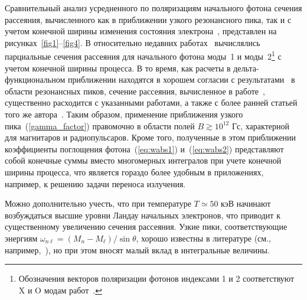 \documentclass[cp1251%
               ]{jetp} %
\begin{document}
Сравнительный анализ усредненного по поляризациям начального фотона сечения 
рассеяния, вычисленного как в приближении узкого резонансного пика, так и с 
учетом конечной ширины изменения состояния электрона~\cite{Harding:1991,SchwarmD:2017}, представлен на 
рисунках~\ref{fig1}--\ref{fig4}.  
В относительно недавних работах~\cite{Mushtukov:2016,SchwarmD:2017} вычислялись 
парциальные сечения рассеяния для начального фотона моды~1 и моды~2\footnote{Обозначения векторов поляризации фотонов индексами 1 и 2 соответствуют X и O модам работ~\cite{Mushtukov:2016,SchwarmD:2017}.} с учетом 
конечной ширины процесса. В то время, как расчеты в дельта-функциональном 
приближении находятся в хорошем согласии с 
результатами~\cite{Harding:1991,SchwarmD:2017} в области резонансных пиков, 
сечение рассеяния, вычисленное в работе~\cite{Mushtukov:2016}, существенно 
расходится с указанными работами, а также с более ранней статьей того же 
автора~\cite{Mushtukov:2015}. Таким образом, применение 
приближения узкого пика~(\ref{gamma_factor}) правомочно  в области полей $B \gtrsim 10^{12}$ Гс, характерной для магнитаров и радиопульсаров. Кроме того, 
полученные в этом приближении коэффициенты поглощения фотона~(\ref{eq:wabs1}) 
и~(\ref{eq:wabs2}) 
представляют собой конечные суммы вместо многомерных интегралов при учете 
конечной ширины процесса, что является гораздо более 
удобным в приложениях, например, к решению задачи переноса излучения.

Можно дополнительно учесть, что при температуре $T\simeq 50$ кэВ начинают 
возбуждаться высшие уровни Ландау начальных электронов, что приводит к 
существенному увеличению  сечения рассеяния. Узкие пики, соответствующие 
энергиям $\omega_{n\ell}=(M_n-M_\ell)/\sin \theta$, хорошо известны в 
литературе (см., например,~\cite{Pavlov:1991,Klepikov:1954,Baier:2007}), но при этом вносят 
малый вклад в интегральные величины.


\end{document}
